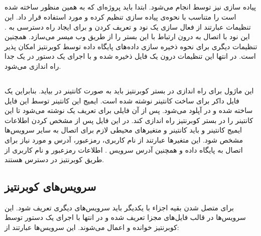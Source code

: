 \subsection{}

پیاده سازی  نیز توسط  انجام می‌شود. ابتدا باید پروژه‌ای که به همین منظور ساخته شده است را متناسب با نحوه‌ی پیاده سازی تنظیم کرده و مورد استفاده قرار داد. این تنظیمات عبارتند از فعال سازی یک نود  و تعریف کردن  و  برای ایجاد راه دسترسی به . این نود با اتصال به   درون  ارتباط با این بستر را از طریق وب میسر می‌سازد. همچنین تنظیمات دیگری برای نحوه ذخیره سازی داده‌های پایگاه داده  توسط کوبرنتیز امکان پذیر است. در انتها این تنظیمات درون یک فایل ذخیره شده و  با اجرای یک دستور  در یک  جدا راه اندازی می‌شود.

\subsection{}

این ماژول برای راه اندازی در بستر کوبرنتیز باید به صورت کانتینر در بیاید. بنابراین یک فایل داکر  برای ساخت کانتینر نوشته شده است. ایمیج این کانتینر توسط این فایل ساخته شده و  در  آپلود می‌شود. پس از آن فایلی برای تعریف یک  نوشته می‌شود تا این کانتینر را در بستر کوبرنتیز راه اندازی کند. در این فایل پس از مشخص کردن اطلاعات ایمیج کانتینر و  باید  کانتینر و متغیرهای محیطی لازم برای اتصال به سایر سرویس‌ها مشخص شود. این متغیرها عبارتند از نام کاربری، رمزعبور، آدرس و  مورد نیاز برای اتصال به پایگاه داده  و همچنین آدرس سرویس . اطلاعات رمزعبور و نام کاربری از طریق  کوبرنتیز در دسترس هستند.

\subsection{سرویس‌های کوبرنتیز}

برای متصل شدن بقیه اجزاء با یکدیگر باید سرویس‌های دیگری تعریف شود. این سرویس‌ها در قالب فایل‌های مجزا تعریف شده و در انتها با اجرای یک دستور  توسط کوبرنتیز خوانده و اعمال می‌شوند. این سرویس‌ها عبارتند از:

